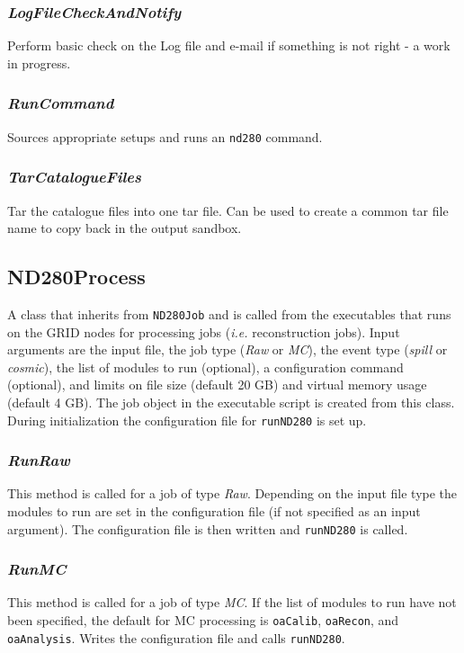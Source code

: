 \documentclass[11pt]{article}
\begin{document}
\subsubsection*{\textit{LogFileCheckAndNotify}}
Perform basic check on the Log file and e-mail if something is not
right - a work in progress.

\subsubsection*{\textit{RunCommand}}
Sources appropriate setups and runs an \verb+nd280+ command.

\subsubsection*{\textit{TarCatalogueFiles}}
Tar the catalogue files into one tar file. Can be used to create a
common tar file name to copy back in the output sandbox. 


\subsection{ND280Process}
A class that inherits from \verb+ND280Job+ and is called from the
executables that runs on the GRID nodes for processing jobs
(\textit{i.e.} reconstruction jobs). Input arguments are the input
file, the job type (\textit{Raw} or \textit{MC}), the event type
(\textit{spill} or \textit{cosmic}), the list of modules to run
(optional), a configuration command (optional), and limits on file
size (default 20 GB) and virtual memory usage (default 4 GB). The job
object in the executable script is created from this class. During
initialization the configuration file for \verb+runND280+ is set up.

\subsubsection*{\textit{RunRaw}}
This method is called for a job of type \textit{Raw}. Depending on the
input file type the modules to run are set in the configuration file
(if not specified as an input argument). The configuration file is
then written and \verb+runND280+ is called. 

\subsubsection*{\textit{RunMC}}
This method is called for a job of type \textit{MC}. If the list of
modules to run have not been specified, the default for MC processing
is \verb+oaCalib+, \verb+oaRecon+, and \verb+oaAnalysis+. Writes the
configuration file and calls \verb+runND280+. 
\end{document}
